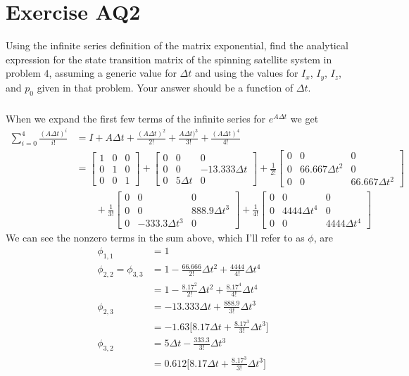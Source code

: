 \documentclass[11pt]{article}
\begin{document}
\section*{Exercise AQ2}
Using the infinite series definition of the matrix exponential, find the analytical expression for the state transition matrix of the spinning satellite system in problem $4$, assuming a generic value for $\Delta t$ and using the values for $I_x$, $I_y$, $I_z$, and $p_0$ given in that problem. Your answer should be a function of $\Delta t$. 

\subparagraph{}
When we expand the first few terms of the infinite series for $e^{A\Delta t}$ we get
\begin{align*}
	\sum_{i=0}^4 \frac{(A\Delta t)^i}{i!} &= I + A\Delta t + \frac{(A\Delta t)^2}{2!} + \frac{A\Delta t)^3}{3!} + \frac{(A\Delta t)^4}{4!} \\
	&= \begin{bmatrix} 1 & 0 & 0 \\
					   0 & 1 & 0 \\
					   0 & 0 & 1 \end{bmatrix} + 
	   \begin{bmatrix} 0 & 0 & 0 \\
	   				   0 & 0 & -13.333\Delta t \\
	   				   0 & 5\Delta t & 0 \end{bmatrix} 
	   + \frac{1}{2!} 
	   \begin{bmatrix} 0 & 0 & 0 \\
	   				   0 & 66.667\Delta t^2 & 0 \\
	   				   0 & 0 & 66.667\Delta t^2 \end{bmatrix} \\
	   &\qquad + \frac{1}{3!}
	   \begin{bmatrix} 0 & 0 & 0 \\
	   				   0 & 0 & 888.9\Delta t^3 \\
	   				   0 & -333.3\Delta t^3 & 0 \end{bmatrix}
	   + \frac{1}{4!}
	   \begin{bmatrix} 0 & 0 & 0 \\
	   				   0 & 4444\Delta t^4 & 0 \\
	   				   0 & 0 & 4444\Delta t^4 \end{bmatrix}
\end{align*}
We can see the nonzero terms in the sum above, which I'll refer to as $\phi$, are
\begin{align*}
	\phi_{1,1} &= 1 \\
	\phi_{2,2} = \phi_{3,3} &= 1-\frac{66.666}{2!}\Delta t^2 + \frac{4444}{4!}\Delta t^4 \\
	&= 1 - \frac{8.17^2}{2!}\Delta t^2 + \frac{8.17^4}{4!}\Delta t^4 \\
	\phi_{2,3} &= -13.333\Delta t + \frac{888.9}{3!}\Delta t^3 \\
	&= -1.63 \Big[8.17\Delta t + \frac{8.17^3}{3!}\Delta t^3 \Big] \\
	\phi_{3,2} &= 5\Delta t - \frac{333.3}{3!}\Delta t^3 \\
	&= 0.612 \Big[8.17\Delta t + \frac{8.17^3}{3!}\Delta t^3 \Big]
\end{align*}
\end{document}
